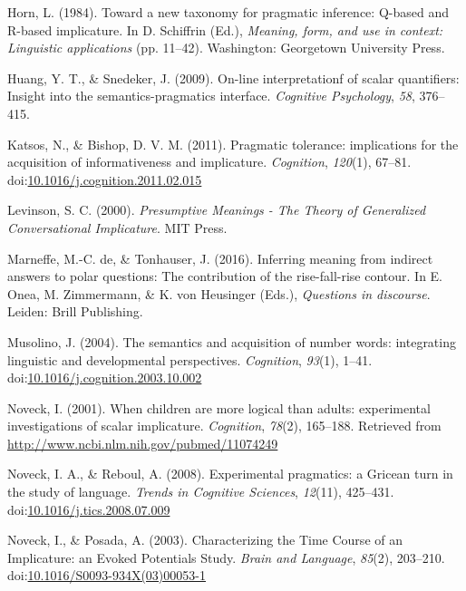 \documentclass[floatsintext,man]{apa6}
\theoremstyle{definition}
\theoremstyle{definition}
\theoremstyle{definition}
\theoremstyle{remark}
\begin{document}
\hypertarget{ref-horn1984}{}
Horn, L. (1984). Toward a new taxonomy for pragmatic inference: Q-based
and R-based implicature. In D. Schiffrin (Ed.), \emph{Meaning, form, and
use in context: Linguistic applications} (pp. 11--42). Washington:
Georgetown University Press.

\hypertarget{ref-huang2009}{}
Huang, Y. T., \& Snedeker, J. (2009). On-line interpretationf of scalar
quantifiers: Insight into the semantics-pragmatics interface.
\emph{Cognitive Psychology}, \emph{58}, 376--415.

\hypertarget{ref-Katsos2011}{}
Katsos, N., \& Bishop, D. V. M. (2011). Pragmatic tolerance:
implications for the acquisition of informativeness and implicature.
\emph{Cognition}, \emph{120}(1), 67--81.
doi:\href{https://doi.org/10.1016/j.cognition.2011.02.015}{10.1016/j.cognition.2011.02.015}

\hypertarget{ref-levinson2000}{}
Levinson, S. C. (2000). \emph{Presumptive Meanings - The Theory of
Generalized Conversational Implicature}. MIT Press.

\hypertarget{ref-DeMarneffe2017}{}
Marneffe, M.-C. de, \& Tonhauser, J. (2016). Inferring meaning from
indirect answers to polar questions: The contribution of the
rise-fall-rise contour. In E. Onea, M. Zimmermann, \& K. von Heusinger
(Eds.), \emph{Questions in discourse}. Leiden: Brill Publishing.

\hypertarget{ref-Musolino2004}{}
Musolino, J. (2004). The semantics and acquisition of number words:
integrating linguistic and developmental perspectives. \emph{Cognition},
\emph{93}(1), 1--41.
doi:\href{https://doi.org/10.1016/j.cognition.2003.10.002}{10.1016/j.cognition.2003.10.002}

\hypertarget{ref-Noveck2001}{}
Noveck, I. (2001). When children are more logical than adults:
experimental investigations of scalar implicature. \emph{Cognition},
\emph{78}(2), 165--188. Retrieved from
\url{http://www.ncbi.nlm.nih.gov/pubmed/11074249}

\hypertarget{ref-noveck2008}{}
Noveck, I. A., \& Reboul, A. (2008). Experimental pragmatics: a Gricean
turn in the study of language. \emph{Trends in Cognitive Sciences},
\emph{12}(11), 425--431.
doi:\href{https://doi.org/10.1016/j.tics.2008.07.009}{10.1016/j.tics.2008.07.009}

\hypertarget{ref-Noveck2003}{}
Noveck, I., \& Posada, A. (2003). Characterizing the Time Course of an
Implicature: an Evoked Potentials Study. \emph{Brain and Language},
\emph{85}(2), 203--210.
doi:\href{https://doi.org/10.1016/S0093-934X(03)00053-1}{10.1016/S0093-934X(03)00053-1}
\end{document}
